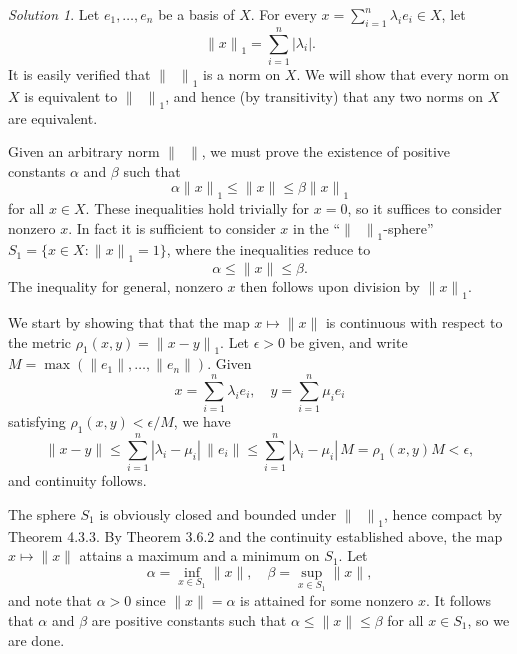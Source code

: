 \documentclass{report}
\newcommand{\norm}[1]{{\lVert #1 \rVert}}
\theoremstyle{remark}
\newtheorem*{solution}{Solution}
\begin{document}
\begin{solution}
  Let $e_1, \dots, e_n$ be a basis of $X$. For every $x = \sum_{i=1}^n \lambda_i e_i \in X$, let
  \begin{equation*}
    \norm{x}_1 = \sum_{i=1}^n |\lambda_i|.
  \end{equation*}
  It is easily verified that $\norm{\phantom x}_1$ is a norm on $X$. We will show that every norm on $X$ is equivalent to $\norm{\phantom x}_1$, and hence (by transitivity) that any two norms on $X$ are equivalent.

  Given an arbitrary norm $\norm{\phantom x}$, we must prove the existence of positive constants $\alpha$ and $\beta$ such that
  \begin{equation*}
    \alpha \norm{x}_1 \le \norm x \le \beta \norm{x}_1
  \end{equation*}
  for all $x \in X$. These inequalities hold trivially for $x = 0$, so it suffices to consider nonzero $x$. In fact it is sufficient to consider $x$ in the ``$\norm{\phantom x}_1$-sphere'' $S_1 = \{x \in X: \norm{x}_1 = 1\}$, where the inequalities reduce to
  \begin{equation*}
    \alpha \le \norm x \le \beta.
  \end{equation*}
  The inequality for general, nonzero $x$ then follows upon division by $\norm{x}_1$.

  We start by showing that that the map $x \mapsto \norm x$ is continuous with respect to the metric $\rho_1(x,y) = \norm{x - y}_1$. Let $\epsilon > 0$ be given, and write $M = \max(\norm{e_1}, \dots, \norm{e_n})$. Given
  \begin{equation*}
    x = \sum_{i=1}^n \lambda_i e_i, \quad y = \sum_{i=1}^n \mu_i e_i
  \end{equation*}
  satisfying $\rho_1(x,y) < \epsilon/M$, we have
  \begin{equation*}
    \norm{x-y} \le \sum_{i=1}^n |\lambda_i - \mu_i| \, \norm{e_i} \le \sum_{i=1}^n |\lambda_i - \mu_i| \, M = \rho_1(x,y) M < \epsilon,
  \end{equation*}
  and continuity follows.

  The sphere $S_1$ is obviously closed and bounded under $\norm{\phantom x}_1$, hence compact by Theorem 4.3.3. By Theorem 3.6.2 and the continuity established above, the map $x \mapsto \norm x$ attains a maximum and a minimum on $S_1$. Let
  \begin{equation*}
    \alpha = \inf_{x \in S_1} \norm x, \quad \beta = \sup_{x \in S_1} \norm x,
  \end{equation*}
  and note that $\alpha > 0$ since $\norm x = \alpha$ is attained for some nonzero $x$. It follows that $\alpha$ and $\beta$ are positive constants such that $\alpha \le \norm x \le \beta$ for all $x \in S_1$, so we are done.
\end{solution}
\end{document}
